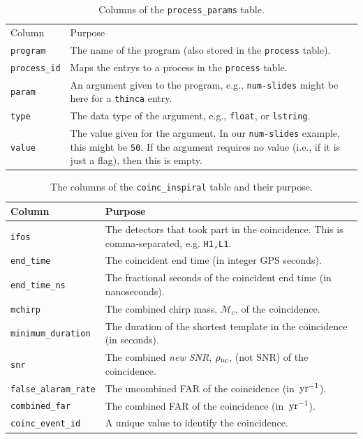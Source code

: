 \begin{table}[p]
\label{tab:process_params}
\center
\begin{tabular}{l | p{10cm}}
Column      &   Purpose     \\
\texttt{program}    &   The name of the program (also stored in the \texttt{process} table). \\
\hline
\texttt{process\_id}    &   Maps the entrys to a process in the \texttt{process} table. \\
\hline
\texttt{param}      &   An argument given to the program, e.g., \texttt{num-slides} might be here for a \texttt{thinca} entry. \\
\hline
\texttt{type}   &   The data type of the argument, e.g., \texttt{float}, or \texttt{lstring}. \\
\hline
\texttt{value}  &   The value given for the argument. In our \texttt{num-slides} example, this might be \texttt{50}. If the argument requires no value (i.e., if it is just a flag), then this is empty.
\end{tabular}
\caption{Columns of the \texttt{process\_params} table.}
\end{table}

\pagebreak

\begin{table}[p]
\label{tab:coinc_inspiral}
\center
\begin{tabular}{l | p{10cm}}
Column      &   Purpose     \\
\hline \hline
\texttt{ifos}   &   The detectors that took part in the coincidence. This is comma-separated, e.g. \texttt{H1,L1}. \\
\hline
\texttt{end\_time}  &   The coincident end time (in integer GPS seconds). \\
\hline
\texttt{end\_time\_ns} &    The fractional seconds of the coincident end time (in nanoseconds). \\
\hline
\texttt{mchirp} &   The combined chirp mass, $\mathcal{M}_c$, of the coincidence. \\
\hline
\texttt{minimum\_duration}  &   The duration of the shortest template in the coincidence (in seconds). \\
\hline
\texttt{snr}    &   The combined \emph{new \ac{SNR}}, $\rho_{\mathrm{nc}}$, (not \ac{SNR}) of the coincidence. \\
\hline
\texttt{false\_alaram\_rate} & The uncombined \ac{FAR} of the coincidence (in $\,\mathrm{yr}^{-1}$). \\
\hline
\texttt{combined\_far}  & The combined \ac{FAR} of the coincidence (in $\,\mathrm{yr}^{-1}$). \\
\hline
\texttt{coinc\_event\_id}   & A unique value to identify the coincidence.
\end{tabular}
\caption{The columns of the \texttt{coinc\_inspiral} table and their purpose.}
\end{table}

